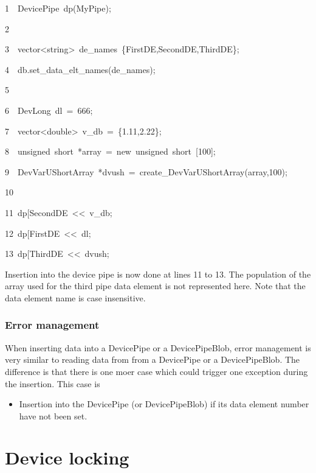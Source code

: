 
\begin{lyxcode}
1~~DevicePipe~dp(\textquotedbl{}MyPipe\textquotedbl{});

2~

3~~vector<string>~de\_names~\{\textquotedbl{}FirstDE\textquotedbl{},\textquotedbl{}SecondDE\textquotedbl{},\textquotedbl{}ThirdDE\textquotedbl{}\};

4~~db.set\_data\_elt\_names(de\_names);

5

6~~DevLong~dl~=~666;~~

7~~vector<double>~v\_db~=~\{1.11,2.22\};

8~~unsigned~short~{*}array~=~new~unsigned~short~{[}100{]};

9~~DevVarUShortArray~{*}dvush~=~create\_DevVarUShortArray(array,100);

10

11~dp{[}\textquotedbl{}SecondDE\textquotedbl{}{]}~<\textcompwordmark{}<~v\_db;

12~dp{[}\textquotedbl{}FirstDE\textquotedbl{}{]}~<\textcompwordmark{}<~dl;

13~dp{[}\textquotedbl{}ThirdDE\textquotedbl{}{]}~<\textcompwordmark{}<~dvush;
\end{lyxcode}


Insertion into the device pipe is now done at lines 11 to 13. The
population of the array used for the third pipe data element is not
represented here. Note that the data element name is case insensitive.

\subsubsection{Error management}

When inserting data into a DevicePipe or a DevicePipeBlob, error management
is very similar to reading data from from a DevicePipe or a DevicePipeBlob.
The difference is that there is one moer case which could trigger
one exception during the insertion. This case is
\begin{itemize}
\item Insertion into the DevicePipe (or DevicePipeBlob) if its data element
number have not been set.
\end{itemize}

\section{Device locking}

